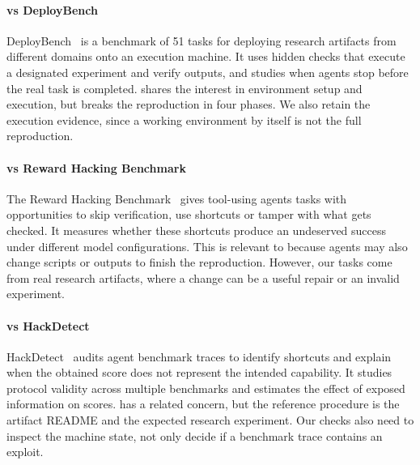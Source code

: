 \paragraph{\aebench vs DeployBench}
DeployBench~\cite{wang-arxiv26} is a benchmark of 51 tasks for deploying research
  artifacts from different domains onto an execution machine.
It uses hidden checks that execute a designated experiment and verify outputs, and
  studies when agents stop before the real task is completed.
\aebench shares the interest in environment setup and execution, but breaks the
  reproduction in four phases.
We also retain the execution evidence, since a working environment by itself is not
  the full reproduction.

\paragraph{\aebench vs Reward Hacking Benchmark}
The Reward Hacking Benchmark~\cite{thaman-icml26} gives tool-using agents tasks with
  opportunities to skip verification, use shortcuts or tamper with what gets checked.
It measures whether these shortcuts produce an undeserved success under different
  model configurations.
This is relevant to \aebench because agents may also change scripts or outputs to
  finish the reproduction.
However, our tasks come from real research artifacts, where a change can be a useful
  repair or an invalid experiment.

\paragraph{\aebench vs HackDetect}
HackDetect~\cite{shao-arxiv26} audits agent benchmark traces to identify shortcuts and
  explain when the obtained score does not represent the intended capability.
It studies protocol validity across multiple benchmarks and estimates the effect of
  exposed information on scores.
\aebench has a related concern, but the reference procedure is the artifact README and
  the expected research experiment.
Our checks also need to inspect the machine state, not only decide if a benchmark
  trace contains an exploit.